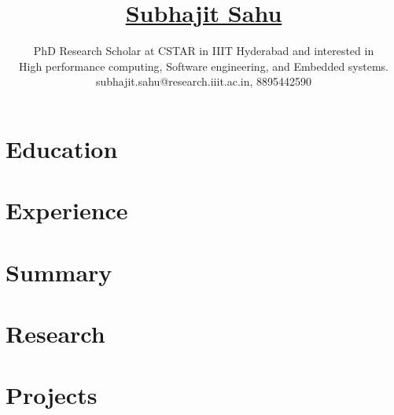 \documentclass[11pt]{article}
\title{
  \vspace{-6ex}
  \href{https://wolfram77.github.io/}{Subhajit Sahu}
  \vspace{-4ex}
}
\author{
  PhD Research Scholar at CSTAR in IIIT Hyderabad and interested in \\
  High performance computing, Software engineering, and Embedded systems. \\
  {\small subhajit.sahu@research.iiit.ac.in, 8895442590} \\
}
\date{}
\begin{document}
\maketitle
\vspace{-9ex}

\section{Education}


\section{Experience}


\section{Summary}


% 

\section{Research}


\section{Projects}



% 
% 
\end{document}
